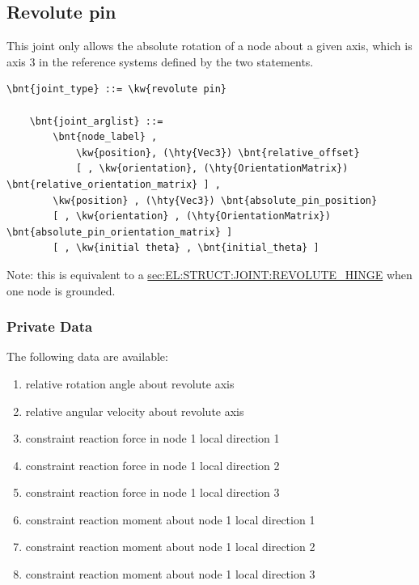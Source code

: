 \subsection{Revolute pin}
\label{sec:EL:STRUCT:JOINT:REVOLUTE_PIN}
This joint only allows the absolute rotation of a node about
a given axis, which is axis 3 in the reference systems defined 
by the two  statements.
\begin{Verbatim}[commandchars=\\\{\}]
    \bnt{joint_type} ::= \kw{revolute pin}

    \bnt{joint_arglist} ::= 
        \bnt{node_label} ,
            \kw{position}, (\hty{Vec3}) \bnt{relative_offset}
            [ , \kw{orientation}, (\hty{OrientationMatrix}) \bnt{relative_orientation_matrix} ] ,
        \kw{position} , (\hty{Vec3}) \bnt{absolute_pin_position}
        [ , \kw{orientation} , (\hty{OrientationMatrix}) \bnt{absolute_pin_orientation_matrix} ]
        [ , \kw{initial theta} , \bnt{initial_theta} ]
\end{Verbatim}
Note: this is equivalent to a
\hyperref{\kw{revolute hinge}}{\kw{revolute hinge} (see Section~}{)}{sec:EL:STRUCT:JOINT:REVOLUTE_HINGE}
when one node is grounded.

\subsubsection{Private Data}
The following data are available:
\begin{enumerate}
\item {} relative rotation angle about revolute axis
\item {} relative angular velocity about revolute axis
\item {} constraint reaction force in node 1 local direction 1
\item {} constraint reaction force in node 1 local direction 2
\item {} constraint reaction force in node 1 local direction 3
\item {} constraint reaction moment about node 1 local direction 1
\item {} constraint reaction moment about node 1 local direction 2
\item {} constraint reaction moment about node 1 local direction 3
\end{enumerate}

